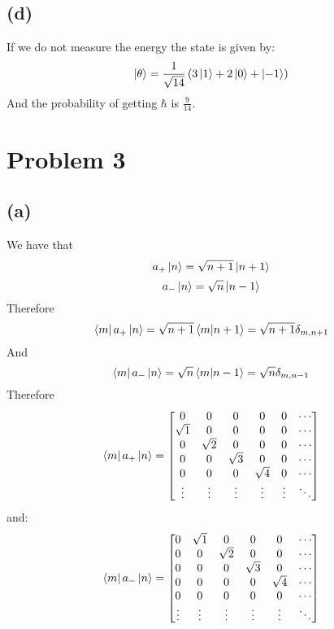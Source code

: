 \documentclass[11pt]{article}
\begin{document}
\subsection*{(d)}
If we do not measure the energy the state is given by:
$$\ket{\theta} = \frac{1}{\sqrt{14}}
\left(3\ket{1}+2\ket{0}+\ket{-1}\right)$$
And the probability of getting $\hbar$ is $\frac{9}{14}$.
\section*{Problem 3}
\subsection*{(a)}
We have that 
$$a_{+}\ket{n} = \sqrt{n+1}\ket{n+1}$$
$$a_{-}\ket{n} = \sqrt{n}\ket{n-1}$$
Therefore 
$$\bra{m}a_{+}\ket{n}= \sqrt{n+1}\bra{m}\ket{n+1}=
\sqrt{n+1}\delta_{m,n+1}$$
And
$$\bra{m}a_{-}\ket{n}= \sqrt{n}\bra{m}\ket{n-1}=
\sqrt{n}\delta_{m,n-1}$$
Therefore 
$$\bra{m}a_{+}\ket{n}
=\begin{bmatrix}
    0 & 0 & 0 & 0 & 0 & \cdots \\
    \sqrt{1} & 0 & 0 & 0 & 0 & \cdots \\
    0 & \sqrt{2} & 0 & 0 & 0 & \cdots \\
    0 & 0 & \sqrt{3} & 0 & 0 & \cdots \\
    0 & 0 & 0 & \sqrt{4} & 0 & \cdots \\
    \vdots & \vdots & \vdots & \vdots & \vdots & \ddots
\end{bmatrix}$$
and:
$$\bra{m}a_{-}\ket{n}
=\begin{bmatrix}
    0 & \sqrt{1} & 0 & 0 & 0 & \cdots \\
    0 & 0 & \sqrt{2} & 0 & 0 & \cdots \\
    0 & 0 & 0 & \sqrt{3} & 0 & \cdots \\
    0 & 0 & 0 & 0 & \sqrt{4} & \cdots \\
    0 & 0 & 0 & 0 & 0 & \cdots \\
    \vdots & \vdots & \vdots & \vdots & \vdots & \ddots
\end{bmatrix}$$
\end{document}
